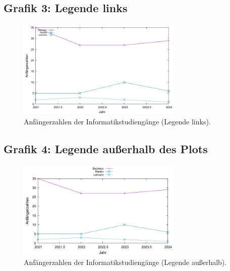 \documentclass[a4paper,12pt]{article}
\begin{document}
\subsection*{Grafik 3: Legende links}
\begin{figure}[h!]
    \centering
    \includegraphics[width=0.7\textwidth]{plot3.pdf} %
    \caption{Anfängerzahlen der Informatikstudiengänge (Legende links).}
\end{figure}

\subsection*{Grafik 4: Legende außerhalb des Plots}
\begin{figure}[h!]
    \centering
    \includegraphics[width=0.7\textwidth]{plot4.pdf} %
    \caption{Anfängerzahlen der Informatikstudiengänge (Legende außerhalb).}
\end{figure}
\end{document}
